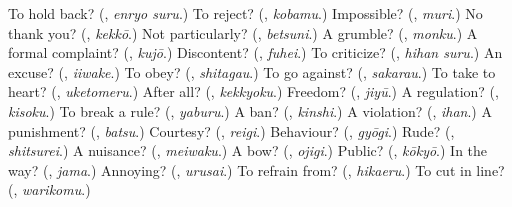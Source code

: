 \begin{tcolorbox}[breakable,colback=teal!4,colframe=teal!35!black,title={Before you move on}]
To hold back? (\textbf{}, \emph{enryo suru}.) To reject? (\textbf{}, \emph{kobamu}.) Impossible? (\textbf{}, \emph{muri}.) No thank you? (\textbf{}, \emph{kekkō}.) Not particularly? (\textbf{}, \emph{betsuni}.) A grumble? (\textbf{}, \emph{monku}.) A formal complaint? (\textbf{}, \emph{kujō}.) Discontent? (\textbf{}, \emph{fuhei}.) To criticize? (\textbf{}, \emph{hihan suru}.) An excuse? (\textbf{}, \emph{iiwake}.) To obey? (\textbf{}, \emph{shitagau}.) To go against? (\textbf{}, \emph{sakarau}.) To take to heart? (\textbf{}, \emph{uketomeru}.) After all? (\textbf{}, \emph{kekkyoku}.) Freedom? (\textbf{}, \emph{jiyū}.) A regulation? (\textbf{}, \emph{kisoku}.) To break a rule? (\textbf{}, \emph{yaburu}.) A ban? (\textbf{}, \emph{kinshi}.) A violation? (\textbf{}, \emph{ihan}.) A punishment? (\textbf{}, \emph{batsu}.) Courtesy? (\textbf{}, \emph{reigi}.) Behaviour? (\textbf{}, \emph{gyōgi}.) Rude? (\textbf{}, \emph{shitsurei}.) A nuisance? (\textbf{}, \emph{meiwaku}.) A bow? (\textbf{}, \emph{ojigi}.) Public? (\textbf{}, \emph{kōkyō}.) In the way? (\textbf{}, \emph{jama}.) Annoying? (\textbf{}, \emph{urusai}.) To refrain from? (\textbf{}, \emph{hikaeru}.) To cut in line? (\textbf{}, \emph{warikomu}.)
\end{tcolorbox}
